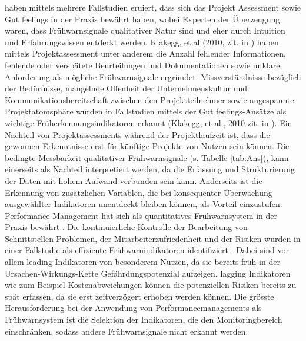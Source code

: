 \citet[S.~59]{haan13} haben mittels mehrere Fallstudien eruiert, dass sich das Projekt Assessment sowie \glqq Gut feelings\grqq{} in der Praxis bewährt haben, wobei Experten der Überzeugung waren, dass Frühwarnsignale qualitativer Natur sind und eher durch Intuition und Erfahrungswissen entdeckt werden. Klakegg, et.al (2010, zit. in \citealp{haankra13}) haben mittels Projektassessment unter anderem die Anzahl fehlender Informationen, fehlende oder verspätete Beurteilungen und Dokumentationen sowie unklare Anforderung als mögliche Frühwarnsignale ergründet. Missverständnisse bezüglich der Bedürfnisse, mangelnde Offenheit der Unternehmenskultur und Kommunikationsbereitschaft zwischen den Projektteilnehmer sowie angespannte Projektatomsphäre wurden in Fallstudien mittels der \glqq Gut feelings\grqq{}-Ansätze als wichtige Früherkennungsindikatoren erkannt (Klakegg, et al., 2010 zit. in \citealp{haankra13}). Ein Nachteil von Projektassessments während der Projektlaufzeit ist, dass die gewonnen Erkenntnisse erst für künftige Projekte von Nutzen sein können. Die bedingte Messbarkeit qualitativer Frühwarnsignale (s. Tabelle \ref{tab:Ans}), kann einerseits als Nachteil interpretiert werden, da die Erfassung und Strukturierung der Daten mit hohem Aufwand verbunden sein kann. Anderseits ist die Erkennung von zusätzlichen Variablen, die bei konsequenter Überwachung ausgewählter Indikatoren unentdeckt bleiben können, als Vorteil einzustufen. Performance Management hat sich als quantitatives Frühwarnsystem in der Praxis bewährt \citep*{haan13}. Die kontinuierliche Kontrolle der Bearbeitung von Schnittstellen-Problemen, der Mitarbeiterzufriedenheit und der Risiken wurden in einer Fallstudie als effiziente Frühwarnindikatoren identifiziert \citep*{haan13}. Dabei sind vor allem \glqq leading\grqq{} Indikatoren von besonderem Nutzen, da sie bereits früh in der Ursachen-Wirkungs-Kette Gefährdungspotenzial aufzeigen. \glqq lagging\grqq{} Indikatoren wie zum Beispiel Kostenabweichungen können die potenziellen Risiken bereits zu spät erfassen, da sie erst zeitverzögert erhoben werden können. Die grösste Herausforderung bei der Anwendung von Performancemanagements als Frühwarnsystem ist die Selektion der Indikatoren, die den Monitoringbereich einschränken, sodass andere Frühwarnsignale nicht erkannt werden.



